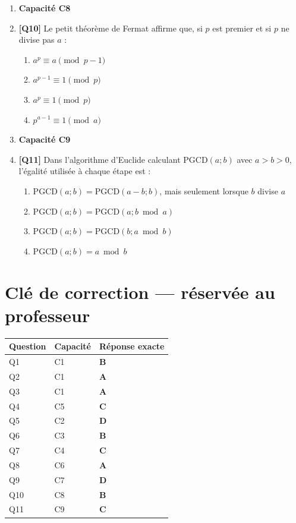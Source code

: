 \begin{enumerate}
\item[] \textbf{Capacité C8}

\item \textbf{[Q10]} Le petit théorème de Fermat affirme que, si $p$ est premier et si $p$ ne divise pas $a$ :
  \begin{enumerate}[label=\Alph*.]
    \item $a^p\equiv a \pmod{p-1}$
    \item $a^{p-1}\equiv1 \pmod p$
    \item $a^{p}\equiv1 \pmod p$
    \item $p^{a-1}\equiv1 \pmod a$
  \end{enumerate}

\item[] \textbf{Capacité C9}

\item \textbf{[Q11]} Dans l'algorithme d'Euclide calculant $\mathrm{PGCD}(a;b)$ avec $a>b>0$, l'égalité utilisée à chaque étape est :
  \begin{enumerate}[label=\Alph*.]
    \item $\mathrm{PGCD}(a;b)=\mathrm{PGCD}(a-b;b)$, mais seulement lorsque $b$ divise $a$
    \item $\mathrm{PGCD}(a;b)=\mathrm{PGCD}(a;b \bmod a)$
    \item $\mathrm{PGCD}(a;b)=\mathrm{PGCD}(b;a \bmod b)$
    \item $\mathrm{PGCD}(a;b)=a \bmod b$
  \end{enumerate}

\end{enumerate}

\ifnxVersionProfesseur
\clearpage
\section*{Clé de correction — réservée au professeur}

\begin{center}
\begin{tabular}{lll}
\hline
Question & Capacité & Réponse exacte \\
\hline
Q1 & C1 & \textbf{B} \\
Q2 & C1 & \textbf{A} \\
Q3 & C1 & \textbf{A} \\
Q4 & C5 & \textbf{C} \\
Q5 & C2 & \textbf{D} \\
Q6 & C3 & \textbf{B} \\
Q7 & C4 & \textbf{C} \\
Q8 & C6 & \textbf{A} \\
Q9 & C7 & \textbf{D} \\
Q10 & C8 & \textbf{B} \\
Q11 & C9 & \textbf{C} \\
\hline
\end{tabular}
\end{center}

